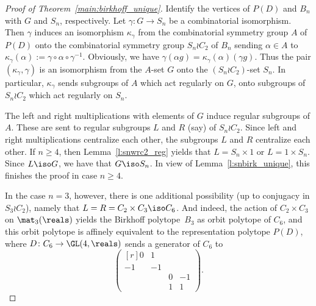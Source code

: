 \begin{proof}[Proof of Theorem~\ref{main:birkhoff_unique}]
    Identify the vertices of $P(D)$ and $B_n$
    with $G$ and $S_n$, respectively.
    Let 
    $\gamma\colon G\to S_n$ be a combinatorial isomorphism.
    Then $\gamma$ induces an isomorphism $\kappa_{\gamma}$
    from the combinatorial symmetry group
    $A$ of $P(D)$ onto the combinatorial symmetry group
    $S_n\wr C_2$ of $B_n$ sending 
    $\alpha\in A$ to 
    $\kappa_{\gamma}(\alpha):=\gamma \circ \alpha \circ \gamma^{-1}$.
    Obviously,
    we have $\gamma(\alpha g) = \kappa_{\gamma}(\alpha)(\gamma g)$.
    Thus the pair
    $(\kappa_{\gamma}, \gamma)$ is an isomorphism
    from the $A$-set $G$ onto the 
    $(S_n\wr C_2)$-set $S_n$.    
    In particular, $\kappa_{\gamma}$ sends subgroups
    of $A$ which act regularly on $G$, onto subgroups
    of $S_n \wr C_2$ which act regularly on $S_n$.

    The left and right multiplications with elements of $G$
    induce regular subgroups of $A$.
    These are sent to regular subgroups
    $L$ and $R$ (say) of $S_n \wr C_2$.
    Since left and right multiplications centralize each other,
    the subgroups $L$ and $R$ centralize each other.
    If $n\geq 4$, then Lemma~\ref{l:snwrc2_reg} yields
    that $L= S_n \times 1$ or $L=1\times S_n$. 
    Since $L\iso G$, we have that $G\iso S_n$.
    In view of Lemma~\ref{l:snbirk_unique},
    this finishes the proof in case $n\geq 4$.
    
    In the case $n=3$, however, there is one additional
    possibility (up to conjugacy in $S_3 \wr C_2$),
    namely that 
    $L= R = C_2 \times C_3\iso C_6$.
    And indeed, the action of
    $C_2\times C_3$ on $\mat_3(\reals)$ yields the 
    Birkhoff polytope~$B_3$ as orbit polytope of $C_6$,    
    and this orbit polytope is affinely equivalent 
    to the representation polytope $P(D)$,
    where $D\colon C_6 \to \GL(4,\reals)$
    sends a generator of $C_6$ to
    \[ \begin{pmatrix*}[r]
         0 & 1 & & \\
        -1 & -1 & & \\
           &    & 0 & -1 \\
           &    & 1 & 1 
       \end{pmatrix*}.
    \]
\end{proof}  
